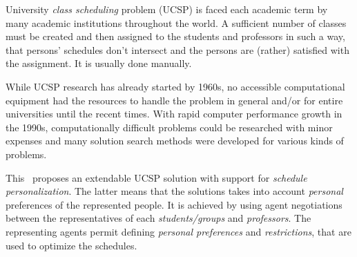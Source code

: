 University \emph{class scheduling} problem (UCSP) is faced each academic term
by many academic institutions throughout the world. A sufficient number of classes must
be created and then assigned to the students and professors in such a way,
that persons' schedules don't intersect and the persons are (rather) satisfied
with the assignment. It is usually done manually.

While UCSP research has already started by 1960s,
no accessible computational equipment had the resources to handle the problem
in general and/or for entire universities until the recent times.
With rapid computer performance growth in the 1990s, computationally
difficult problems could be researched with minor expenses and many
solution search methods were developed for various kinds of problems.
\medskip

\noindent
This \thisdoc\ proposes an extendable UCSP solution with support for
\emph{schedule personalization}. The latter means that the solutions takes
into account \emph{personal} preferences of the represented people.
It is achieved by using agent negotiations between the representatives of each
\emph{students/groups} and \emph{professors}. The representing agents permit defining
\emph{personal preferences} and \emph{restrictions}, that are used to optimize
the schedules.
